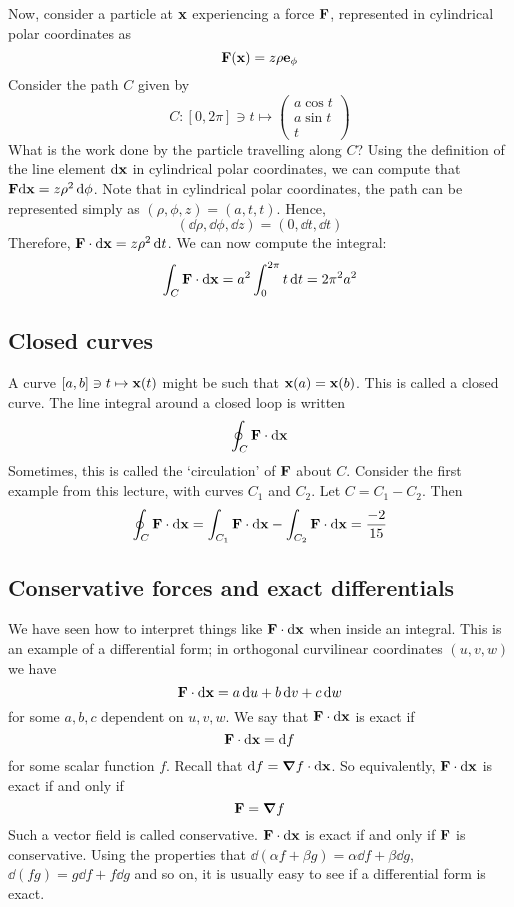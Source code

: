 Now, consider a particle at \(\vb x\) experiencing a force \(\vb F\), represented in cylindrical polar coordinates as
\[
	\vb F(\vb x) = z\rho \vb e_{\phi}
\]
Consider the path \(C\) given by
\[
	C \colon [0, 2\pi] \ni t \mapsto \begin{pmatrix}
		a \cos t \\ a \sin t \\ t
	\end{pmatrix}
\]
What is the work done by the particle travelling along \(C\)?
Using the definition of the line element \(\dd \vb x\) in cylindrical polar coordinates, we can compute that \(\vb F \dd \vb x = z \rho^2 \dd{\phi}\).
Note that in cylindrical polar coordinates, the path can be represented simply as \((\rho, \phi, z) = (a, t, t)\).
Hence,
\[
	(\dd{\rho}, \dd{\phi}, \dd{z}) = (0, \dd{t}, \dd{t})
\]
Therefore, \(\vb F \cdot \dd \vb x = z \rho^2 \dd{t}\).
We can now compute the integral:
\[
	\int_C \vb F \cdot \dd \vb x = a^2 \int_0^{2\pi} t\dd{t} = 2\pi^2a^2
\]

\subsection{Closed curves}
A curve \([a, b] \ni t \mapsto \vb x(t)\) might be such that \(\vb x(a) = \vb x(b)\).
This is called a closed curve.
The line integral around a closed loop is written
\[
	\oint_C \vb F \cdot \dd \vb x
\]
Sometimes, this is called the `circulation' of \(\vb F\) about \(C\).
Consider the first example from this lecture, with curves \(C_1\) and \(C_2\).
Let \(C = C_1 - C_2\).
Then
\[
	\oint_C \vb F \cdot \dd \vb x = \int_{C_1} \vb F \cdot \dd \vb x - \int_{C_2} \vb F \cdot \dd \vb x = \frac{-2}{15}
\]

\subsection{Conservative forces and exact differentials}
We have seen how to interpret things like \(\vb F \cdot \dd \vb x\) when inside an integral.
This is an example of a differential form; in orthogonal curvilinear coordinates \((u, v, w)\) we have
\[
	\vb F \cdot \dd \vb x = a \dd{u} + b \dd{v} + c \dd{w}
\]
for some \(a, b, c\) dependent on \(u, v, w\).
We say that \(\vb F \cdot \dd \vb x\) is exact if
\[
	\vb F \cdot \dd \vb x = \dd{f}
\]
for some scalar function \(f\).
Recall that \(\dd{f} = \grad f \cdot \dd \vb x\).
So equivalently, \(\vb F \cdot \dd \vb x\) is exact if and only if
\[
	\vb F = \grad f
\]
Such a vector field is called conservative.
\(\vb F \cdot \dd \vb x\) is exact if and only if \(\vb F\) is conservative.
Using the properties that \(\dd (\alpha f + \beta g) = \alpha \dd{f} + \beta \dd{g}\), \(\dd (fg) = g \dd{f} + f \dd{g}\) and so on, it is usually easy to see if a differential form is exact.

